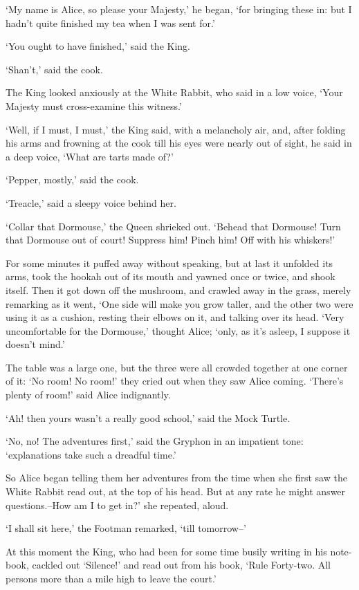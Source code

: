 \documentclass[statementpaper,twoside,openany]{memoir}
\begin{document}
`My name is Alice, so please your Majesty,' he began, `for bringing these in: but I hadn't quite finished my tea when I was sent for.'

`You ought to have finished,' said the King.

`Shan't,' said the cook.

The King looked anxiously at the White Rabbit, who said in a low voice, `Your Majesty must cross-examine this witness.'

`Well, if I must, I must,' the King said, with a melancholy air, and, after folding his arms and frowning at the cook till his eyes were nearly out of sight, he said in a deep voice, `What are tarts made of?'

`Pepper, mostly,' said the cook.

`Treacle,' said a sleepy voice behind her.

`Collar that Dormouse,' the Queen shrieked out. `Behead that Dormouse! Turn that Dormouse out of court! Suppress him! Pinch him! Off with his whiskers!'

For some minutes it puffed away without speaking, but at last it unfolded its arms, took the hookah out of its mouth and yawned once or twice, and shook itself. Then it got down off the mushroom, and crawled away in the grass, merely remarking as it went, `One side will make you grow taller, and the other two were using it as a cushion, resting their elbows on it, and talking over its head. `Very uncomfortable for the Dormouse,' thought Alice; `only, as it's asleep, I suppose it doesn't mind.'

The table was a large one, but the three were all crowded together at one corner of it: `No room! No room!' they cried out when they saw Alice coming. `There's plenty of room!' said Alice indignantly.

`Ah! then yours wasn't a really good school,' said the Mock Turtle.

`No, no! The adventures first,' said the Gryphon in an impatient tone: `explanations take such a dreadful time.'

So Alice began telling them her adventures from the time when she first saw the White Rabbit read out, at the top of his head. But at any rate he might answer questions.--How am I to get in?' she repeated, aloud.

`I shall sit here,' the Footman remarked, `till tomorrow--'

At this moment the King, who had been for some time busily writing in his note-book, cackled out `Silence!' and read out from his book, `Rule Forty-two. All persons more than a mile high to leave the court.'
\end{document}
